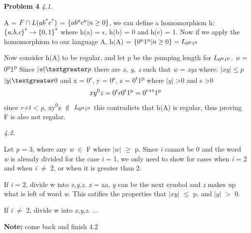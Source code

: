 \documentclass[12pt]{report}
\begin{document}
\textbf{Problem 4}\newline
\textit{4.1.}
\begin{flushleft}
	A = $F \cap L(ab\textsuperscript{*}c\textsuperscript{*})$ = $\{ab\textsuperscript{n}c\textsuperscript{n} \vert n \geq 0\}$, we can define a homomorphism h:$\{\textit{a,b,c}\}\textsuperscript{*} \rightarrow \{0,1\}\textsuperscript{*}$ where h(a) = $\epsilon$, h(b) = 0 and h(c) = 1.  Now if we apply the homomorphism to our language A, h(A) = $\{0\textsuperscript{n}1\textsuperscript{n} \vert n \geq 0\} = L_{0\textsuperscript{n}1\textsuperscript{n}}$\newline
	
	Now consider h(A) to be regular, and let p be the pumping length for $L_{0\textsuperscript{n}1\textsuperscript{n}}$.\newline
	\textit{w} = 0\textsuperscript{p}1\textsuperscript{p}\newline
	Since $\vert \textit{w} \vert \textgreater  p$ there are \textit{x, y, z} such that \textit{w} = \textit{xyz} where:\newline
	\tab $\vert xy \vert \leq p$ \newline
	\tab $\vert y \vert \textgreater 0$\newline
	\tab and  x = 0\textsuperscript{r}, y = 0\textsuperscript{s}, z = 0\textsuperscript{t}1\textsuperscript{p} where $\vert y \vert$ \textgreater 0 and s \textgreater 0
	\begin{equation*}
		xy\textsuperscript{0}z = 0\textsuperscript{r}\epsilon0\textsuperscript{t}1\textsuperscript{p} = 0\textsuperscript{r+t}1\textsuperscript{p}
	\end{equation*}
	since \textit{r+t} \textless \textit{ p}, xy\textsuperscript{0}z $\notin$ $L_{0\textsuperscript{n}1\textsuperscript{n}}$ this contradicts that h(A) is regular, thus proving F is also not regular.
\end{flushleft}
	
\pagebreak
\textit{4.2.}
\begin{flushleft}

Let \textit{p} = 3, where any \textit{w} $\in$ F where $\vert w \vert$  $\geq$ p.\newline
Since \textit{i} cannot be 0 and the word \textit{w} is already divided for the case \textit{i} = 1, we only need to show for cases when \textit{i} = 2 and when \textit{i} $\neq$ 2, or when it is greater than 2.

If \textit{i} = 2, divide w into \textit{x,y,z}.  \textit{x} = aa, \textit{y} can be the next symbol and \textit{z} makes up what is left of word \textit{w}.  This satifies the properties that $\vert xy \vert$ $\leq$ p, and  \newline $\vert y \vert$ $>$ 0.

If \textit{i} $\neq$ 2, divide w into \textit{x,y,z}. ...

\textbf{Note:} come back and finish  4.2

\end{flushleft}
\end{document}
